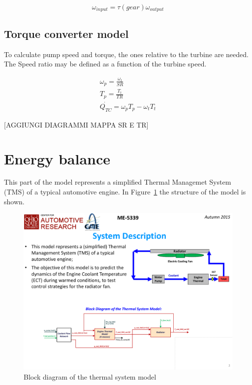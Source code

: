 \begin{equation}
  \omega_{input}=\tau(gear)\omega_{output}
\end{equation}
\subsection{Torque converter model}
To calculate pump speed and torque, the ones relative to the turbine are needed. The Speed ratio may be defined as a function of the turbine speed.

\begin{gather*}
  \omega_{p}    = \frac{\omega_{t}}{SR}             \\
  T_{p}  = \frac{T_{t}}{TR} \\
     \dot{Q_{TC}}  = \omega_{p}T_{p} - \omega_{t}T_{t} 
\end{gather*}

[AGGIUNGI DIAGRAMMI MAPPA SR E TR]

\section{Energy balance}
\label{sec:energy_balance}

This part of the model represents a simplified Thermal Managemet System (TMS) of a typical automotive engine. In Figure~\ref{fig:th_block_diagram} the structure of the model is shown. 

\begin{figure}[ht]
  \centering
  \includegraphics[width=\textwidth]{figures/model/th_block_diagram.pdf}
  \caption{Block diagram of the thermal system model\label{fig:th_block_diagram} }
\end{figure}

